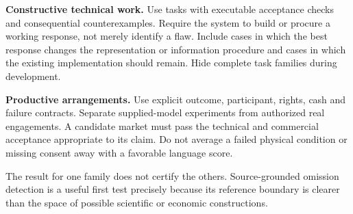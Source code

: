 \textbf{Constructive technical work.} Use tasks with executable acceptance checks and consequential counterexamples. Require the system to build or procure a working response, not merely identify a flaw. Include cases in which the best response changes the representation or information procedure and cases in which the existing implementation should remain. Hide complete task families during development.

\textbf{Productive arrangements.} Use explicit outcome, participant, rights, cash and failure contracts. Separate supplied-model experiments from authorized real engagements. A candidate market must pass the technical and commercial acceptance appropriate to its claim. Do not average a failed physical condition or missing consent away with a favorable language score.

The result for one family does not certify the others. Source-grounded omission detection is a useful first test precisely because its reference boundary is clearer than the space of possible scientific or economic constructions.

